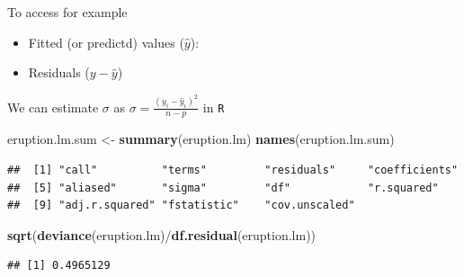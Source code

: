 \documentclass[]{article}
\def\tightlist{}
\newenvironment{Shaded}{\begin{snugshade}}{\end{snugshade}}
\newcommand{\KeywordTok}[1]{\textcolor[rgb]{0.13,0.29,0.53}{\textbf{{#1}}}}
\newcommand{\StringTok}[1]{\textcolor[rgb]{0.31,0.60,0.02}{{#1}}}
\newcommand{\NormalTok}[1]{{#1}}
\numberwithin{equation}{section}
\begin{document}
To access for example

\begin{itemize}
\tightlist
\item
  Fitted (or predictd) values (\(\hat{y}\)):
\end{itemize}

\begin{Shaded}
\end{Shaded}

\begin{itemize}
\tightlist
\item
  Residuals (\(y-\hat{y}\))
\end{itemize}

\begin{Shaded}
\end{Shaded}

We can estimate \(\sigma\) as \(\sigma = \frac{(y_i-\hat{y}_i)^2}{n-p}\)
in \texttt{R}

\begin{Shaded}
\begin{Highlighting}[]
\NormalTok{eruption.lm.sum <-}\StringTok{ }\KeywordTok{summary}\NormalTok{(eruption.lm)}
\KeywordTok{names}\NormalTok{(eruption.lm.sum)}
\end{Highlighting}
\end{Shaded}

\begin{verbatim}
##  [1] "call"          "terms"         "residuals"     "coefficients" 
##  [5] "aliased"       "sigma"         "df"            "r.squared"    
##  [9] "adj.r.squared" "fstatistic"    "cov.unscaled"
\end{verbatim}

\begin{Shaded}
\begin{Highlighting}[]
\KeywordTok{sqrt}\NormalTok{(}\KeywordTok{deviance}\NormalTok{(eruption.lm)/}\KeywordTok{df.residual}\NormalTok{(eruption.lm))}
\end{Highlighting}
\end{Shaded}

\begin{verbatim}
## [1] 0.4965129
\end{verbatim}
\end{document}
